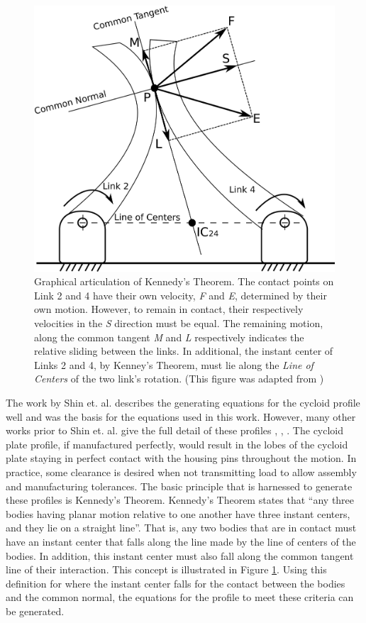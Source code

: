 \begin{figure}[!b]
   \centering
   \includegraphics[width=0.60\linewidth]{fig/kennedy_sliding}
   \caption{Graphical articulation of Kennedy's Theorem. The contact points on Link 2 and 4 have their own velocity, \textit{F} and \textit{E}, determined by their own motion. However, to remain in contact, their respectively velocities in the \textit{S} direction must be equal. The remaining motion, along the common tangent \textit{M} and \textit{L} respectively indicates the relative sliding between the links. In additional, the instant center of Links 2 and 4, by Kenney's Theorem, must lie along the \textit{Line of Centers} of the two link's rotation. (This figure was adapted from \cite{ref:kinematics_and_dynamics})}
   \label{fig:kennedy_sliding}
\end{figure}

The work by Shin et. al. \cite{ref:on_the_lobe} describes the generating equations for the cycloid profile well and was the basis for the equations used in this work. However, many other works prior to Shin et. al. give the full detail of these profiles \cite{ref:malhorta_2}, \cite{ref:hwang_hsieh}, \cite{ref:design_and_application}.
The cycloid plate profile, if manufactured perfectly, would result in the lobes of the cycloid plate staying in perfect contact with the housing pins throughout the motion. In practice, some clearance is desired when not transmitting load to allow assembly and manufacturing tolerances. The basic principle that is harnessed to generate these profiles is Kennedy's Theorem. Kennedy's Theorem states that ``any three bodies having planar motion relative to one another have three instant centers, and they lie on a straight line''\cite{ref:kinematics_and_dynamics}.  That is, any two bodies that are in contact must have an instant center that falls along the line made by the line of centers of the bodies. In addition, this instant center must also fall along the common tangent line of their interaction. This concept is illustrated in Figure \ref{fig:kennedy_sliding}. Using this definition for where the instant center falls for the contact between the bodies and the common normal, the equations for the profile to meet these criteria can be generated. 

